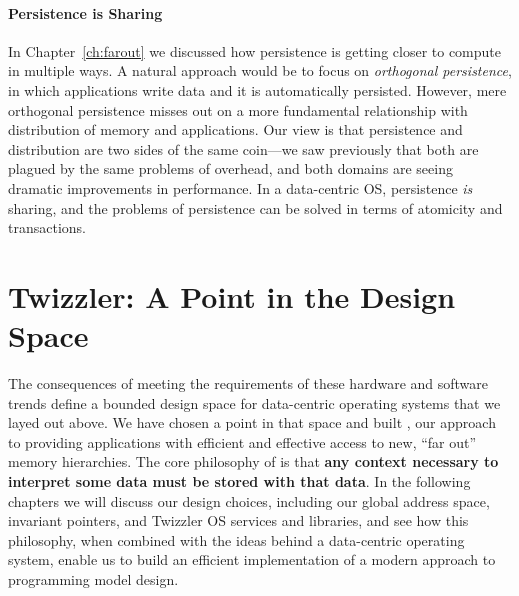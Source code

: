 \paragraph{Persistence is Sharing} In Chapter~\ref{ch:farout} we discussed how persistence is getting closer to compute
in multiple ways. A natural approach would be to focus on \emph{orthogonal persistence}, in which applications write
data and it is automatically persisted. However, mere orthogonal persistence misses out on a more fundamental
relationship with distribution of memory and applications. Our view is that persistence and distribution are
two sides of the same coin---we saw previously that both are plagued by the same problems of overhead, and both domains
are seeing dramatic improvements in performance. In a data-centric OS, persistence \emph{is} sharing, and the
problems of persistence can be solved in terms of atomicity and transactions.

\section{Twizzler: A Point in the Design Space}

The consequences of meeting the requirements of these hardware and software trends
define a bounded design space for data-centric operating systems that we layed out above. We have
chosen a point in that space and built \Twizzler, our approach to providing
applications with efficient and effective access to new, ``far out'' memory hierarchies.
The core philosophy of \Twizzler is that \textbf{any context necessary to interpret some data must be stored with that
    data}.
In the
following chapters we will discuss our design choices, including our global address space, invariant pointers, and
Twizzler OS services and libraries, and see how this philosophy, when combined with the ideas behind a data-centric
operating system,
enable us to build an efficient implementation of a modern approach to programming model design.

